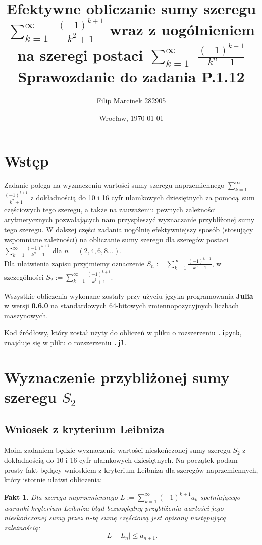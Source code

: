 \documentclass{article}
\date{Wrocław, \today}
\title{\textbf{Efektywne obliczanie sumy szeregu\\ \vspace{2mm} $\displaystyle\sum_{k=1}^{\infty}$ $\frac{(-1)^{k+1}}{k^2+1}$ 
		    wraz z uogólnieniem \\ na szeregi postaci $\displaystyle\sum_{k=1}^{\infty}$ $\frac{(-1)^{k+1}}{k^n+1}$}
		    \\ \vspace{3mm} Sprawozdanie do zadania P.1.12}
\author{Filip Marcinek 282905}
\newtheorem{fakt}{Fakt}
\begin{document}
\maketitle

\section{Wstęp} 
\indent\hspace{5mm} Zadanie polega na wyznaczeniu wartości sumy szeregu naprzemiennego $\sum_{k=1}^{\infty}$ $\frac{(-1)^{k+1}}{k^2+1}$
z dokładnością do 10 i 16 cyfr ułamkowych dziesiętnych za pomocą sum częściowych tego szeregu, a także na zauważeniu pewnych zależności arytmetycznych pozwalających
nam przyspieszyć wyznaczanie przybliżonej sumy tego szeregu. W dalszej części zadania uogólnię efektywniejszy sposób (stosujący wspomniane zależności) na obliczanie sumy szeregu dla szeregów postaci $\sum_{k=1}^{\infty}\frac{(-1)^{k+1}}{k^n+1}$ dla $n = (2,4,6,8\dots )$.\\
\indent Dla ułatwienia zapisu przyjmiemy oznaczenie $S_n := \sum_{k=1}^{\infty}\frac{(-1)^{k+1}}{k^n+1}$, w szczególności
$S_2 := \sum_{k=1}^{\infty}\frac{(-1)^{k+1}}{k^2+1}$.

\indent Wszystkie obliczenia wykonane zostały przy użyciu języka programowania \textbf{Julia} w wersji \textbf{0.6.0} na standardowych 64-bitowych zmiennopozycyjnych liczbach maszynowych.

\indent Kod źródłowy, który został użyty do obliczeń w pliku o rozszerzeniu \verb+.ipynb+, znajduje się w pliku o rozszerzeniu \verb+.jl+.


\section{Wyznaczenie przybliżonej sumy szeregu $S_2$}
\subsection{Wniosek z kryterium Leibniza}
\indent\hspace{4mm} Moim zadaniem będzie wyznaczenie wartości nieskończonej sumy szeregu $S_2$ z dokładnością do 10 i 16 cyfr ułamkowych dziesiętnych.
Na początek podam prosty fakt będący wnioskiem z kryterium Leibniza dla szeregów naprzemiennych, który istotnie ułatwi obliczenia:
\begin{fakt}
 Dla szeregu naprzemiennego $L := \sum_{k=1}^{\infty}(-1)^{k+1} a_k$ spełniającego warunki kryterium Leibniza błąd bezwzględny przybliżenia wartości 
 jego nieskończonej sumy przez $n$-tą sumę częściową
 jest opisany następującą zależnością: 
 \begin{equation}
  |L - L_n| \leqslant a_{n+1}.
 \end{equation}
\end{fakt}
\end{document}
